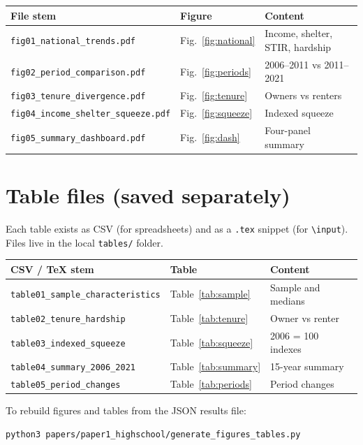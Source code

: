 \documentclass[11pt,letterpaper]{article}
\begin{document}
\begin{center}
\small
\begin{tabular}{lll}
\toprule
File stem & Figure & Content \\
\midrule
\texttt{fig01\_national\_trends.pdf} & Fig.~\ref{fig:national} & Income, shelter, STIR, hardship \\
\texttt{fig02\_period\_comparison.pdf} & Fig.~\ref{fig:periods} & 2006--2011 vs 2011--2021 \\
\texttt{fig03\_tenure\_divergence.pdf} & Fig.~\ref{fig:tenure} & Owners vs renters \\
\texttt{fig04\_income\_shelter\_squeeze.pdf} & Fig.~\ref{fig:squeeze} & Indexed squeeze \\
\texttt{fig05\_summary\_dashboard.pdf} & Fig.~\ref{fig:dash} & Four-panel summary \\
\bottomrule
\end{tabular}
\end{center}

\section{Table files (saved separately)}
\label{app:tables}

Each table exists as CSV (for spreadsheets) and as a \texttt{.tex} snippet (for \texttt{\textbackslash input}).
Files live in the local \texttt{tables/} folder.

\begin{center}
\small
\begin{tabular}{lll}
\toprule
CSV / TeX stem & Table & Content \\
\midrule
\texttt{table01\_sample\_characteristics} & Table~\ref{tab:sample} & Sample and medians \\
\texttt{table02\_tenure\_hardship} & Table~\ref{tab:tenure} & Owner vs renter \\
\texttt{table03\_indexed\_squeeze} & Table~\ref{tab:squeeze} & 2006 = 100 indexes \\
\texttt{table04\_summary\_2006\_2021} & Table~\ref{tab:summary} & 15-year summary \\
\texttt{table05\_period\_changes} & Table~\ref{tab:periods} & Period changes \\
\bottomrule
\end{tabular}
\end{center}

To rebuild figures and tables from the JSON results file:

\begin{verbatim}
python3 papers/paper1_highschool/generate_figures_tables.py
\end{verbatim}
\end{document}
